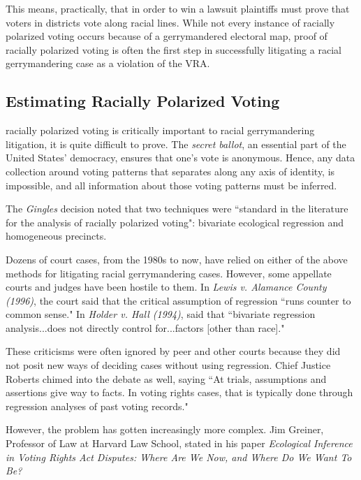 This means, practically, that in order to win a lawsuit plaintiffs must prove that voters in districts vote along racial lines. While not every instance of racially polarized voting occurs because of a gerrymandered electoral map, proof of racially polarized voting is often the first step in successfully litigating a racial gerrymandering case as a violation of the VRA.

\subsection{Estimating Racially Polarized Voting}

 racially polarized voting is critically important to racial gerrymandering litigation, it is quite difficult to prove. The \textit{secret ballot}, an essential part of the United States' democracy, ensures that one's vote is anonymous. Hence, any data collection around voting patterns that separates along any axis of identity, is impossible, and all information about those voting patterns must be inferred.

The \textit{Gingles} decision noted that two techniques were ``standard in the literature for the analysis of racially polarized voting"\cite{thornburg}: bivariate ecological regression and homogeneous precincts.

Dozens of court cases, from the 1980s to now, have relied on either of the above methods for litigating racial gerrymandering cases\cite{greiner}. However, some appellate courts and judges have been hostile to them. In \textit{Lewis v. Alamance County (1996)}\cite{Lewis_Alamance}, the court said that the critical assumption of regression ``runs counter to common sense." In \textit{Holder v. Hall (1994)}\cite{Holder_Hall}, said that ``bivariate regression analysis...does not directly control for...factors [other than race]."

These criticisms were often ignored by peer and other courts because they did not posit new ways of deciding cases without using regression. Chief Justice Roberts chimed into the debate as well, saying ``At trials, assumptions and assertions give way to facts. In voting rights cases, that is typically done through regression analyses of past voting records."\cite{LULAC}

However, the problem has gotten increasingly more complex. Jim Greiner, Professor of Law at Harvard Law School, stated in his paper \textit{Ecological Inference in Voting Rights Act Disputes: Where Are We Now, and Where Do We Want To Be?}\cite{greiner}

